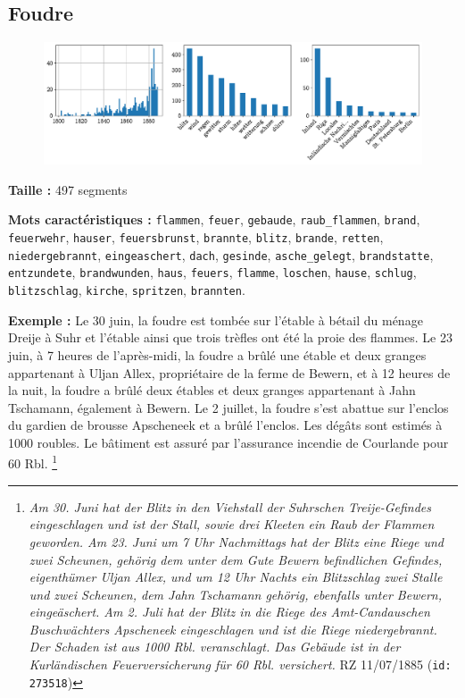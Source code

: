 \documentclass[a4paper,twoside,12pt]{article}
\begin{document}
\clearpage


\subsection*{Foudre} \label{topic15_foudre}

\begin{figure}[H]
\centering
\includegraphics[width=\textwidth]{images/topic_charts_15.pdf}
\end{figure}

\begin{flushleft}
\textbf{Taille :} 497 segments

\textbf{Mots caractéristiques :} \texttt{flammen}, \texttt{feuer}, \texttt{gebaude}, \texttt{raub\_flammen}, \texttt{brand}, \texttt{feuerwehr}, \texttt{hauser}, \texttt{feuersbrunst}, \texttt{brannte}, \texttt{blitz}, \texttt{brande}, \texttt{retten}, \texttt{niedergebrannt}, \texttt{eingeaschert}, \texttt{dach}, \texttt{gesinde}, \texttt{asche\_gelegt}, \texttt{brandstatte}, \texttt{entzundete}, \texttt{brandwunden}, \texttt{haus}, \texttt{feuers}, \texttt{flamme}, \texttt{loschen}, \texttt{hause}, \texttt{schlug}, \texttt{blitzschlag}, \texttt{kirche}, \texttt{spritzen}, \texttt{brannten}.
\end{flushleft}

\medskip

\noindent \textbf{Exemple :} \og Le 30 juin, la foudre est tombée sur l'étable à bétail du ménage Dreije à Suhr et l'étable ainsi que trois trèfles ont été la proie des flammes. Le 23 juin, à 7 heures de l'après-midi, la foudre a brûlé une étable et deux granges appartenant à Uljan Allex, propriétaire de la ferme de Bewern, et à 12 heures de la nuit, la foudre a brûlé deux étables et deux granges appartenant à Jahn Tschamann, également à Bewern. Le 2 juillet, la foudre s'est abattue sur l'enclos du gardien de brousse Apscheneek et a brûlé l'enclos. Les dégâts sont estimés à 1000 roubles. Le bâtiment est assuré par l'assurance incendie de Courlande pour 60 Rbl. \fg{} \footnote{\textit{Am 30. Juni hat der Blitz in den Viehstall der Suhrschen Treije-Gefindes eingeschlagen und ist der Stall, sowie drei Kleeten ein Raub der Flammen geworden. Am 23. Juni um 7 Uhr Nachmittags hat der Blitz eine Riege und zwei Scheunen, gehörig dem unter dem Gute Bewern befindlichen Gefindes, eigenthümer Uljan Allex, und um 12 Uhr Nachts ein Blitzschlag zwei Stalle und zwei Scheunen, dem Jahn Tschamann gehörig, ebenfalls unter Bewern, eingeäschert. Am 2. Juli hat der Blitz in die Riege des Amt-Candauschen Buschwächters Apscheneek eingeschlagen und ist die Riege niedergebrannt. Der Schaden ist aus 1000 Rbl. veranschlagt. Das Gebäude ist in der Kurländischen Feuerversicherung für 60 Rbl. versichert.} RZ 11/07/1885 (\texttt{id: 273518})}
\end{document}
